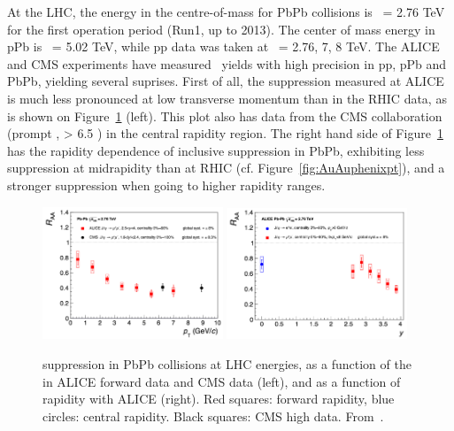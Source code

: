 At the LHC, the energy in the centre-of-mass for PbPb collisions is \snn~=
2.76 TeV for the first operation period (Run1, up to 2013). The center
of mass energy in pPb is \snn~= 5.02 TeV, while pp data was taken at
\s~= 2.76, 7, 8 TeV.
The ALICE and CMS experiments have measured \Jpsi~yields with high
precision in pp, pPb and PbPb, yielding several suprises. First of
all, the suppression measured at ALICE is much less pronounced at low
transverse momentum than in the RHIC data, as is shown on
Figure~\ref{fig:aliceJpsi} (left). This plot also has \Jpsi data from
the CMS collaboration (prompt \Jpsi, \pt > 6.5 \GeVc) in the central
rapidity region. The right hand side of Figure~\ref{fig:aliceJpsi} has the
rapidity dependence of inclusive \Jpsi suppression in PbPb, exhibiting
less suppression at midrapidity than at RHIC
(cf. Figure~\ref{fig:AuAuphenixpt}), and a stronger suppression when
going to higher rapidity ranges.

\begin{figure}[h]
\begin{center}
  \includegraphics[width=0.48\textwidth]{Chapters/pQuarkonia/Aliceraapsipt.png}
  \includegraphics[width=0.48\textwidth]{Chapters/pQuarkonia/Alicepsipbpby.png}
  \caption{\Jpsi suppression in PbPb collisions at LHC energies, as a function of
    the \Jpsi \pt in ALICE forward data and CMS data (left), and as a
    function of \Jpsi rapidity with ALICE (right). Red squares:
    forward rapidity, blue circles: central rapidity. Black squares:
    CMS high \pt data. From~\cite{jpsiALICE}.}
  \label{fig:aliceJpsi}
\end{center}
\end{figure}



